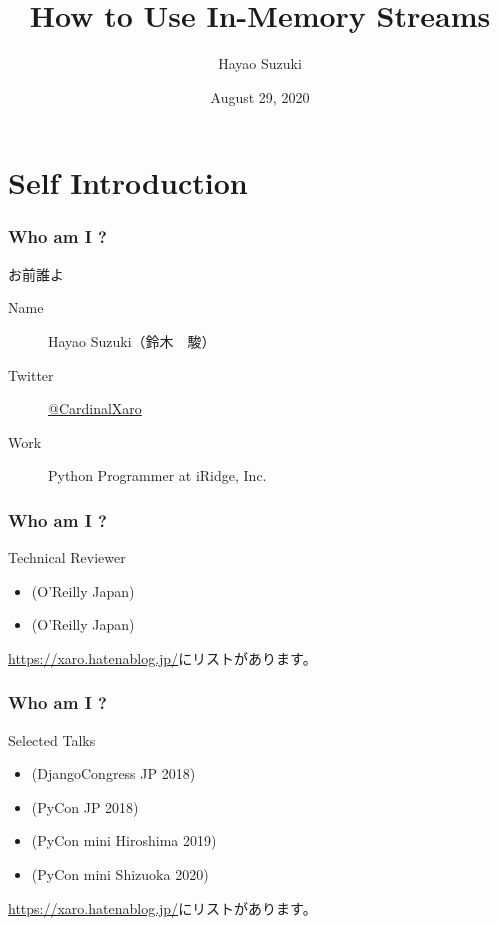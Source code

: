 \documentclass[aspectratio=169,dvipdfmx,14pt,notheorems]{beamer}
\title{How to Use In-Memory Streams}
\author[Hayao]{Hayao Suzuki}
\institute[PyCon JP 2020]{PyCon JP 2020 \#pyconjp\_1}
\date{August 29, 2020}
\theoremstyle{definition}
\begin{document}
\begin{frame}[plain]\frametitle{}
\titlepage %
\end{frame}

\section{Self Introduction}

\begin{frame}\frametitle{Who am I ?}

\begin{block}{お前誰よ}
\begin{description}
\item[Name] Hayao Suzuki（鈴木　駿）
\item[Twitter] \href{https://twitter.com/CardinalXaro}{@CardinalXaro}
\item[Work] Python Programmer at iRidge, Inc.
\end{description}
\end{block}

\end{frame}

\begin{frame}\frametitle{Who am I ?}

\begin{block}{Technical Reviewer}
\begin{itemize}
\item {}(O'Reilly Japan)
\item {}(O'Reilly Japan)
\end{itemize}
\end{block}
\url{https://xaro.hatenablog.jp/}にリストがあります。
\end{frame}

\begin{frame}\frametitle{Who am I ?}

\begin{block}{Selected Talks}
\begin{itemize}
\item {}(DjangoCongress JP 2018)
\item {}(PyCon JP 2018)
\item {}(PyCon mini Hiroshima 2019)
\item {}(PyCon mini Shizuoka 2020)
\end{itemize}
\end{block}
\url{https://xaro.hatenablog.jp/}にリストがあります。
\end{frame}
\end{document}
